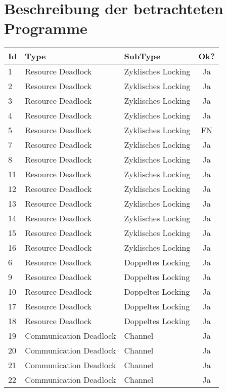 \appendix
\chapter{Beschreibung der betrachteten Programme}\label{Appendix-1}

\begin{longtable}[h]{|l|l|l|c|}
  \hline
  \textbf{Id} & \textbf{Type} & \textbf{SubType} & \textbf{Ok?} \\ \hline
  1 & Resource Deadlock & Zyklisches Locking & Ja \\ \hline
  2 & Resource Deadlock & Zyklisches Locking & Ja \\ \hline
  3 & Resource Deadlock & Zyklisches Locking & Ja \\ \hline
  4 & Resource Deadlock & Zyklisches Locking & Ja \\ \hline
  5 & Resource Deadlock & Zyklisches Locking & FN \\ \hline 
  7 & Resource Deadlock & Zyklisches Locking & Ja \\ \hline
  8 & Resource Deadlock & Zyklisches Locking & Ja \\ \hline
  11 & Resource Deadlock & Zyklisches Locking & Ja \\ \hline
  12 & Resource Deadlock & Zyklisches Locking & Ja \\ \hline
  13 & Resource Deadlock & Zyklisches Locking & Ja \\ \hline
  14 & Resource Deadlock & Zyklisches Locking & Ja \\ \hline
  15 & Resource Deadlock & Zyklisches Locking & Ja \\ \hline
  16 & Resource Deadlock & Zyklisches Locking & Ja \\ \hline
  6 & Resource Deadlock & Doppeltes Locking & Ja \\ \hline
  9 & Resource Deadlock & Doppeltes Locking & Ja \\ \hline
  10 & Resource Deadlock & Doppeltes Locking & Ja \\ \hline
  17 & Resource Deadlock & Doppeltes Locking & Ja \\ \hline
  18 & Resource Deadlock & Doppeltes Locking & Ja \\ \hline
  19 & Communication Deadlock & Channel & Ja \\ \hline
  20 & Communication Deadlock & Channel & Ja \\ \hline
  21 & Communication Deadlock & Channel & Ja \\ \hline
  22 & Communication Deadlock & Channel & Ja \\ \hline

\end{longtable}
